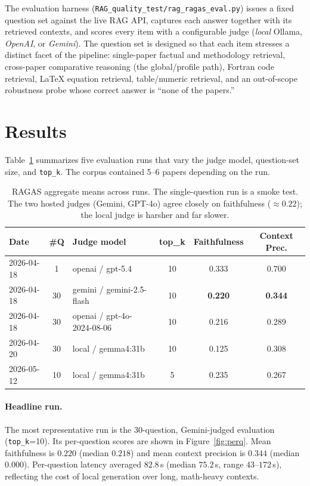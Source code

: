 \documentclass[11pt,a4paper]{article}
\newcommand{\code}[1]{\texttt{\small #1}}
\begin{document}
The evaluation harness (\code{RAG\_quality\_test/rag\_ragas\_eval.py}) issues a
fixed question set against the live RAG API, captures each answer together with
its retrieved contexts, and scores every item with a configurable judge
(\emph{local} Ollama, \emph{OpenAI}, or \emph{Gemini}). The question set is
designed so that each item stresses a distinct facet of the pipeline:
single-paper factual and methodology retrieval, cross-paper comparative
reasoning (the global/profile path), Fortran code retrieval, LaTeX equation
retrieval, table/numeric retrieval, and an out-of-scope robustness probe whose
correct answer is ``none of the papers.''

\section{Results}
Table~\ref{tab:runs} summarizes five evaluation runs that vary the judge model,
question-set size, and \code{top\_k}. The corpus contained 5--6 papers depending
on the run.

\begin{table}[H]
\centering
\small
\renewcommand{\arraystretch}{1.2}
\begin{tabular}{l c l c c c}
\toprule
\textbf{Date} & \textbf{\#Q} & \textbf{Judge model} & \textbf{top\_k}
  & \textbf{Faithfulness} & \textbf{Context Prec.} \\
\midrule
2026-04-18 & 1  & openai / gpt-5.4              & 10 & 0.333 & 0.700 \\
2026-04-18 & 30 & gemini / gemini-2.5-flash     & 10 & \textbf{0.220} & \textbf{0.344} \\
2026-04-18 & 30 & openai / gpt-4o-2024-08-06    & 10 & 0.216 & 0.289 \\
2026-04-20 & 30 & local / gemma4:31b           & 10 & 0.125 & 0.308 \\
2026-05-12 & 10 & local / gemma4:31b           &  5 & 0.235 & 0.267 \\
\bottomrule
\end{tabular}
\caption{RAGAS aggregate means across runs. The single-question run is a smoke
test. The two hosted judges (Gemini, GPT-4o) agree closely on faithfulness
($\approx 0.22$); the local judge is harsher and far slower.}
\label{tab:runs}
\end{table}

\paragraph{Headline run.} The most representative run is the 30-question,
Gemini-judged evaluation (\code{top\_k}=10). Its per-question scores are shown in
Figure~\ref{fig:perq}. Mean faithfulness is $0.220$ (median $0.218$) and mean
context precision is $0.344$ (median $0.000$). Per-question latency averaged
$82.8$\,s (median $75.2$\,s, range $43$--$172$\,s), reflecting the cost of local
generation over long, math-heavy contexts.
\end{document}

